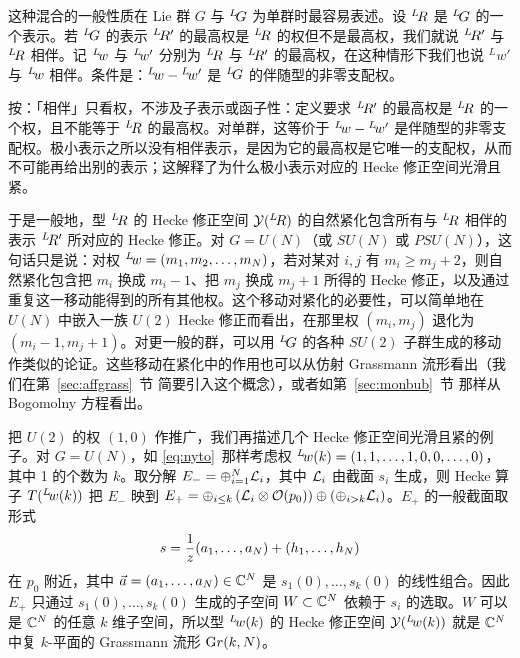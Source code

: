 这种混合的一般性质在 Lie 群 $G$ 与 $^L\negthinspace G$ 为单群时最容易表述。设 $^L\negthinspace R$ 是 $^L\negthinspace G$ 的一个表示。若 $^L\negthinspace G$ 的表示 $^L\negthinspace R'$ 的最高权是 $^L\negthinspace R$ 的权但不是最高权，我们就说 $^L\negthinspace R'$ 与 $^L\negthinspace R$ 相伴。记 $^L\negthinspace w$ 与 $^L\negthinspace w'$ 分别为 $^L\negthinspace R$ 与 $^L\negthinspace R'$ 的最高权，在这种情形下我们也说 $^L w'$ 与 $^L\negthinspace w$ 相伴。条件是：$^L\negthinspace w-{}^L\negthinspace w'$ 是 $^L\negthinspace G$ 的伴随型的非零支配权。

\begin{yizhu}[易错点]
按：「相伴」只看权，不涉及子表示或函子性：定义要求 $^L\negthinspace R'$ 的最高权是 $^L\negthinspace R$ 的一个权，且不能等于 $^L\negthinspace R$ 的最高权。对单群，这等价于 $^L\negthinspace w-{}^L\negthinspace w'$ 是伴随型的非零支配权。极小表示之所以没有相伴表示，是因为它的最高权是它唯一的支配权，从而不可能再给出别的表示；这解释了为什么极小表示对应的 Hecke 修正空间光滑且紧。
\end{yizhu}

于是一般地，型 $^L\negthinspace R$ 的 Hecke 修正空间 ${{\EUY}}(^L\negthinspace R)$ 的自然紧化包含所有与 $^L\negthinspace R$ 相伴的表示 $^L\negthinspace R'$ 所对应的 Hecke 修正。对 $G=U(N)$（或 $SU(N)$ 或 $PSU(N)$），这句话只是说：对权 $^L\negthinspace w=(m_1,m_2,\dots,m_N)$，若对某对 $i,j$ 有 $m_i\geq m_j+2$，则自然紧化包含把 $m_i$ 换成 $m_i-1$、把 $m_j$ 换成 $m_j+1$ 所得的 Hecke 修正，以及通过重复这一移动能得到的所有其他权。这个移动对紧化的必要性，可以简单地在 $U(N)$ 中嵌入一族 $U(2)$ Hecke 修正而看出，在那里权 $(m_i,m_j)$ 退化为 $(m_i-1,m_j+1)$。对更一般的群，可以用 $^L\negthinspace G$ 的各种 $SU(2)$ 子群生成的移动作类似的论证。这些移动在紧化中的作用也可以从仿射 Grassmann 流形看出（我们在第~\ref{sec:affgrass}~节 简要引入这个概念），或者如第~\ref{sec:monbub}~节 那样从 Bogomolny 方程看出。

\par{}

把 $U(2)$ 的权 $(1,0)$ 作推广，我们再描述几个 Hecke 修正空间光滑且紧的例子。对 $G=U(N)$，如 \eqref{eq:nyto}\ 那样考虑权 $^L\negthinspace w(k)=(1,1,\dots,1,0,0,\dots,0)$，其中 1 的个数为 $k$。取分解 $E_-=\oplus_{i=1}^N{\cal L}_i$，其中 ${\cal L}_i$ 由截面 $s_i$ 生成，则 Hecke 算子 $T({}^L\negthinspace w(k))$ 把 $E_-$ 映到 $E_+=\oplus_{i\leq k}\left({\cal L}_i\otimes \CO(p_0)\right)\oplus\left(\oplus_{i>k}{\cal L}_i\right)$。$E_+$ 的一般截面取形式 %
\setcounter{equation}{23}
\begin{equation}\label{eq:nson}
s={1\over
z}(a_1,\dots,a_N)+(h_1,\dots,h_N)
\end{equation}
在 $p_0$ 附近，其中 $\vec a=(a_1,\dots,a_N)\in \Bbb{C}^N$ 是 $s_1(0),\dots,s_k(0)$ 的线性组合。因此 $E_+$ 只通过 $s_1(0),\dots,s_k(0)$ 生成的子空间 $W\subset \Bbb{C}^N$ 依赖于 $s_i$ 的选取。$W$ 可以是 $\Bbb{C}^N$ 的任意 $k$ 维子空间，所以型 $^L\negthinspace w(k)$ 的 Hecke 修正空间 ${{\EUY}}(^L\negthinspace w(k))$ 就是 $\Bbb{C}^N$ 中复 $k$-平面的 Grassmann 流形 ${\rm Gr}(k,N)$。

